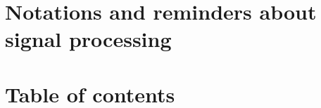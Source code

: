 \documentclass[twoside]{article}
\theoremstyle{remark}
\numberwithin{equation}{subsection}
\newcommand{\TODO}{\textbf{TODO}}
\begin{document}

\newpage
\begin{appendices}
\section{Notations and reminders about signal processing}

\section{Table of contents}
\tableofcontents
\end{appendices}
\end{document}
